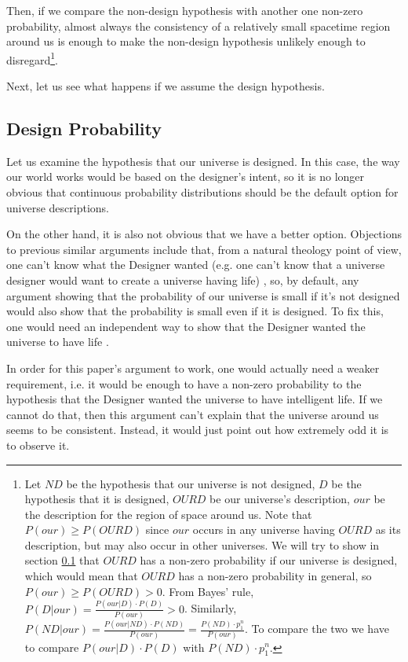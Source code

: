 \documentclass[a4paper
,draft
]{article}
\def\our_description{OURD}
\begin{document}
Then, if we compare the non-design hypothesis
with another one non-zero probability,
almost always the consistency of a relatively small spacetime region around us
is enough to make the non-design hypothesis unlikely enough to
disregard\footnote{
  Let $ND$ be the hypothesis that our universe is not designed,
  $D$ be the hypothesis that it is designed, $\our_description$ be our
  universe's description,
  $our$ be the description for the region of space around us.
  Note that $P(our) \ge P(\our_description)$ since $our$ occurs in any
  universe having $\our_description$ as its description, but may also
  occur in other universes.
  We will try to show in section \ref{sec:design-probability}
  that $\our_description$ has a non-zero probability
  if our universe is designed, which would mean that $\our_description$ has a
  non-zero probability in general, so
  $P(our) \ge P(\our_description) > 0$.
  From Bayes' rule, $P(D|our) = \frac{P(our|D)\cdot P(D)}{P(our)} > 0$.
  Similarly,
  $P(ND|our) = \frac{P(our|ND)\cdot P(ND)}{P(our)}
    = \frac{P(ND) \cdot p_1^n}{P(our)}$.
  To compare the two we have to compare
  $P(our|D)\cdot P(D)$ with $P(ND) \cdot p_1^n$.
  }.

Next, let us see what happens if we assume the design hypothesis.

\subsection{Design Probability}
\label{sec:design-probability}

Let us examine the hypothesis that our universe is designed.
In this case, the way our world works would be based
on the designer's intent,
so it is no longer obvious that continuous probability distributions
should be the default option for universe descriptions.

On the other hand, it is also not obvious that we have a better option.
Objections to previous similar arguments include that,
from a natural theology point of view, one can't
know what the Designer wanted
(e.g. one can't know that a universe designer would want to create
a universe having life) \parencites{Sober2009}{Narveson2003}, so, by default,
any argument showing that the probability of our universe is small
if it's not designed would also show that the probability is small
even if it is designed.
To fix this, one would need an independent way to show that the Designer
wanted the universe to have life \parencite{Sober2003}.

In order for this paper's argument to work, one would actually need a weaker
requirement, i.e. it would be enough to have a non-zero probability
to the hypothesis that the Designer wanted the universe to have intelligent
life. If we cannot do that, then this argument can't explain
that the universe around us seems to be consistent.
Instead, it would just point out how extremely odd it is to observe it.
\end{document}
